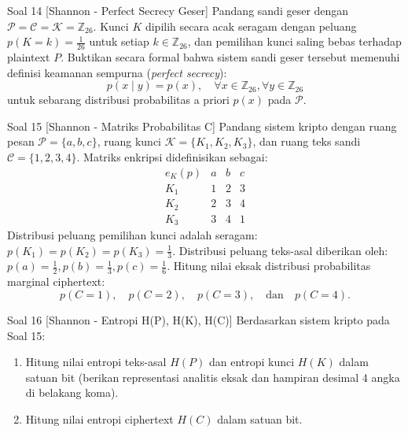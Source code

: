 \documentclass[11pt,a4paper]{article}
\begin{document}
\begin{soalshannon}{Soal 14 [Shannon - Perfect Secrecy Geser]}
Pandang sandi geser dengan $\mathcal{P} = \mathcal{C} = \mathcal{K} = \mathbb{Z}_{26}$. Kunci $K$ dipilih secara acak seragam dengan peluang $p(K = k) = \frac{1}{26}$ untuk setiap $k \in \mathbb{Z}_{26}$, dan pemilihan kunci saling bebas terhadap plaintext $P$.
Buktikan secara formal bahwa sistem sandi geser tersebut memenuhi definisi keamanan sempurna (\textit{perfect secrecy}):
\[
p(x \mid y) = p(x), \quad \forall x \in \mathbb{Z}_{26}, \forall y \in \mathbb{Z}_{26}
\]
untuk sebarang distribusi probabilitas a priori $p(x)$ pada $\mathcal{P}$.
\end{soalshannon}

\begin{soalshannon}{Soal 15 [Shannon - Matriks Probabilitas C]}
Pandang sistem kripto dengan ruang pesan $\mathcal{P} = \{a, b, c\}$, ruang kunci $\mathcal{K} = \{K_1, K_2, K_3\}$, dan ruang teks sandi $\mathcal{C} = \{1, 2, 3, 4\}$. Matriks enkripsi didefinisikan sebagai:
\[
\begin{array}{c|ccc}
e_K(p) & a & b & c \\ \hline
K_1 & 1 & 2 & 3 \\
K_2 & 2 & 3 & 4 \\
K_3 & 3 & 4 & 1
\end{array}
\]
Distribusi peluang pemilihan kunci adalah seragam: $p(K_1) = p(K_2) = p(K_3) = \frac{1}{3}$.
Distribusi peluang teks-asal diberikan oleh: $p(a) = \frac{1}{2}, p(b) = \frac{1}{3}, p(c) = \frac{1}{6}$.
Hitung nilai eksak distribusi probabilitas marginal ciphertext:
\[
p(C = 1), \quad p(C = 2), \quad p(C = 3), \quad \text{dan} \quad p(C = 4).
\]
\end{soalshannon}

\begin{soalshannon}{Soal 16 [Shannon - Entropi H(P), H(K), H(C)]}
Berdasarkan sistem kripto pada Soal 15:
\begin{enumerate}[label=(\alph*)]
    \item Hitung nilai entropi teks-asal $H(P)$ dan entropi kunci $H(K)$ dalam satuan bit (berikan representasi analitis eksak dan hampiran desimal 4 angka di belakang koma).
    \item Hitung nilai entropi ciphertext $H(C)$ dalam satuan bit.
\end{enumerate}
\end{soalshannon}
\end{document}
